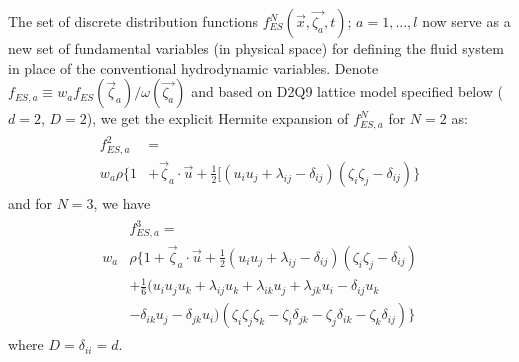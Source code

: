 \documentclass[doublecol]{epl2}
\begin{document}
The set of discrete distribution functions $f^N_{ES}(\vec{x},\vec{\zeta_a} ,t)$; $a =1,...,l$ now serve as a new set of fundamental variables (in physical space) for defining the fluid system in place of the conventional hydrodynamic variables.  Denote $f_{ES,a} \equiv w_{a} f_{ES}(\vec\zeta_a )/{\omega(\vec{\zeta_a})}$ and based on D2Q9 lattice model specified below ($d=2$, $D=2$), we get the explicit Hermite expansion of $f^N_{ES,a}$ for $N=2$ as:
\begin{align}
\begin{split}
f_{ES,a}^{2} &=  \\
w_a \rho \{ 1 &+ \vec \zeta_a \cdot \vec u + \frac{1}{2} [( u_i u_j +\lambda_{ij} -\delta_{ij})(\zeta_i \zeta_j - \delta_{ij}) \}
\end{split}
\end{align}
and for $N=3$, we have
\begin{align}
\begin{split}
&f_{ES,a}^{3} =  \\
w_a &\rho \{ 1 + \vec \zeta_a \cdot \vec u + \frac{1}{2} ( u_i u_j +\lambda_{ij} -\delta_{ij})(\zeta_i \zeta_j - \delta_{ij}) \\
&+ \frac{1}{6} (u_{i} u_{j} u_{k} + \lambda_{i j} u_{k} + \lambda_{i k} u_{j} + \lambda_{j k} u_{i} - \delta_{i j} u_{k} \\
&- \delta_{i k} u_{j} - \delta_{j k} u_{i})(\zeta _{i} \zeta _{j} \zeta _{k}-\zeta _{i}\delta_{jk} -\zeta _{j}\delta _{ik} -\zeta _{k} \delta _{ij}) \}
\end{split}
\end{align}
where $D=\delta_{ii}=d$.
\end{document}
